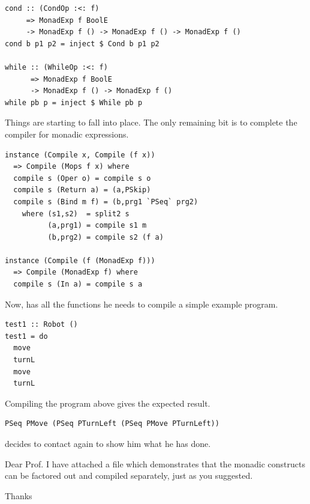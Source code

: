 \begin{small}
\begin{verbatim}
cond :: (CondOp :<: f) 
     => MonadExp f BoolE 
     -> MonadExp f () -> MonadExp f () -> MonadExp f ()
cond b p1 p2 = inject $ Cond b p1 p2

while :: (WhileOp :<: f) 
      => MonadExp f BoolE 
      -> MonadExp f () -> MonadExp f ()
while pb p = inject $ While pb p
\end{verbatim}
\end{small}

Things are starting to fall into place. The only remaining bit is to
complete the compiler for monadic expressions.

\begin{small}
\begin{verbatim}
instance (Compile x, Compile (f x)) 
  => Compile (Mops f x) where
  compile s (Oper o) = compile s o
  compile s (Return a) = (a,PSkip)
  compile s (Bind m f) = (b,prg1 `PSeq` prg2) 
    where (s1,s2)  = split2 s
          (a,prg1) = compile s1 m
          (b,prg2) = compile s2 (f a)

instance (Compile (f (MonadExp f))) 
  => Compile (MonadExp f) where
  compile s (In a) = compile s a
\end{verbatim}
\end{small}

Now, \studname{} has all the functions he needs to compile a simple
example program.

\begin{small}
\begin{verbatim}
test1 :: Robot () 
test1 = do 
  move
  turnL
  move 
  turnL 
\end{verbatim}
\end{small}

\pagebreak 

Compiling the program above gives the expected result. 

\begin{small}
\begin{verbatim}
PSeq PMove (PSeq PTurnLeft (PSeq PMove PTurnLeft))
\end{verbatim}
\end{small}


\studname{} decides to contact \docname{} again to show him what 
he has done.

\vspace{5mm}

\noindent\colorbox{light-gray}{
\begin{minipage}[]{0.9\linewidth}
\noindent 
Dear Prof. \docname{}
\newline \newline
\noindent I have attached a file which demonstrates that the monadic
constructs can be factored out and compiled separately, just as you
suggested.
\newline \newline

\noindent Thanks \newline
\noindent \studname{}
\end{minipage} 
}

